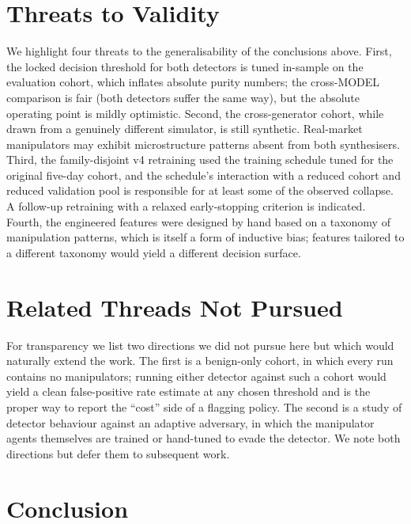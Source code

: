 \documentclass[10pt,twocolumn,letterpaper]{article}
\begin{document}
\section{Threats to Validity}
\label{sec:threats}
We highlight four threats to the generalisability of the conclusions
above. First, the locked decision threshold for both detectors is
tuned in-sample on the evaluation cohort, which inflates absolute
purity numbers; the cross-MODEL comparison is fair (both detectors
suffer the same way), but the absolute operating point is mildly
optimistic. Second, the cross-generator cohort, while drawn from a
genuinely different simulator, is still synthetic. Real-market
manipulators may exhibit microstructure patterns absent from both
synthesisers. Third, the family-disjoint v4 retraining used the
training schedule tuned for the original five-day cohort, and the
schedule's interaction with a reduced cohort and reduced validation
pool is responsible for at least some of the observed collapse. A
follow-up retraining with a relaxed early-stopping criterion is
indicated. Fourth, the engineered features were designed by hand based
on a taxonomy of manipulation patterns, which is itself a form of
inductive bias; features tailored to a different taxonomy would yield
a different decision surface.

\section{Related Threads Not Pursued}
\label{sec:notpursued}
For transparency we list two directions we did not pursue here but
which would naturally extend the work. The first is a benign-only
cohort, in which every run contains no manipulators; running either
detector against such a cohort would yield a clean false-positive rate
estimate at any chosen threshold and is the proper way to report the
``cost'' side of a flagging policy. The second is a study of detector
behaviour against an adaptive adversary, in which the manipulator
agents themselves are trained or hand-tuned to evade the detector. We
note both directions but defer them to subsequent work.

\section{Conclusion}
\label{sec:concl}
\end{document}
